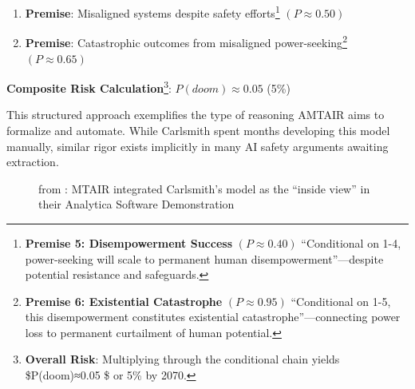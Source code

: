 \documentclass[
  11pt,
  letterpaper,
  openany]{book}
\begin{document}
\begin{enumerate}
{    arguments.} \((P≈0.65)\)
\item
  \textbf{Premise}: Misaligned systems despite safety efforts\footnote{\textbf{Premise
    5: Disempowerment Success} \((P≈0.40)\) ``Conditional on 1-4,
    power-seeking will scale to permanent human
    disempowerment''---despite potential resistance and safeguards.}
  \((P≈0.50)\)
\item
  \textbf{Premise}: Catastrophic outcomes from misaligned
  power-seeking\footnote{\textbf{Premise 6: Existential Catastrophe}
    \((P≈0.95)\) ``Conditional on 1-5, this disempowerment constitutes
    existential catastrophe''---connecting power loss to permanent
    curtailment of human potential.} \((P≈0.65)\)
\end{enumerate}

\textbf{Composite Risk Calculation}\footnote{\textbf{Overall Risk}:
  Multiplying through the conditional chain yields \$P(doom)≈0.05 \$ or
  5\% by 2070.}: \(P(doom)≈0.05\) (5\%)

This structured approach exemplifies the type of reasoning AMTAIR aims
to formalize and automate. While Carlsmith spent months developing this
model manually, similar rigor exists implicitly in many AI safety
arguments awaiting extraction.

\begin{figure}


\caption[Base APS causal map
(clean)]{\label{fig-mtair-insideoutside-base}from
\textcite{manheim2021}: MTAIR integrated Carlsmith's model as the
``inside view'' in their Analytica Software Demonstration}

\end{figure}%
\end{document}
